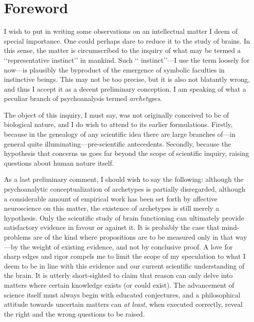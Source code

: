 \documentclass[a4paper]{article}
\begin{document}
    \section{Foreword}

    I wish to put in writing some observations on an intellectual matter I deem
    of special importance. One could perhaps dare to reduce it to the study of
    brains. In this sense, the matter is circumscribed to the inquiry of what may be
    termed a \lq\lq representative instinct\rq\rq{} in mankind. Such \lq\lq
    instinct\rq\rq{}---I use the term loosely for now---is plausibly the
    byproduct of the emergence of symbolic faculties in instinctive beings.
    This may not be too precise, but it is also not blatantly wrong, and thus I
    accept it as a decent preliminary conception. I am speaking of what a
    peculiar branch of psychoanalysis termed \textit{archetypes}.

    The object of this inquiry, I must say, was not originally conceived to be
    of biological nature, and I do wish to attend to its earlier formulations.
    Firstly, because in the genealogy of any scientific idea there are large
    branches of---in general quite illuminating---pre-scientific antecedents.
    Secondly, because the hypothesis that concerns us goes far beyond the scope
    of scientific inquiry, raising questions about human nature itself.

    As a last preliminary comment, I should wish to say the following: although
    the psychoanalytic conceptualization of archetypes is partially disregarded,
    although a considerable amount of empirical work has been set forth by
    affective neuroscience on this matter, the existence of archetypes is still
    merely a hypothesis. Only the scientific study of brain functioning can
    ultimately provide satisfactory evidence in favour or against it. It is
    probably the case that mind-problems are of the kind where propositions are
    to be measured only in that way---by the weight of existing evidence, and not
    by conclusive proof. A love for sharp edges and rigor compels me to limit
    the scope of my speculation to what I deem to be in line with this
    evidence and our current scientific understanding of the brain. It is
    utterly short-sighted to claim that reason can only delve into matters where
    certain knowledge exists (or could exist). The advancement of science itself
    must always begin with educated conjectures, and a philosophical attitude
    towards uncertain matters can \textit{at least}, when executed correctly,
    reveal the right and the wrong questions to be raised.
\end{document}
